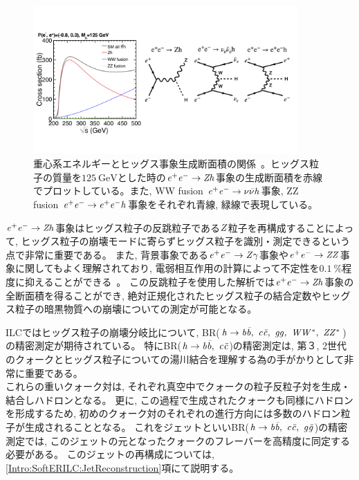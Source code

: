 \begin{figure}[htbp]
 \centering
 \includegraphics[trim= 0 50 0 50, width=0.9\textwidth, clip]{Figure/1Introduction/4eetoZH.png}
 \caption[重心系エネルギーとヒッグス事象生成断面積の関係]{重心系エネルギーとヒッグス事象生成断面積の関係~\cite{ILCTDRVP}。ヒッグス粒子の質量を$125\ \mathrm{GeV}$とした時の$\it e^+e^- \to Zh$事象の生成断面積を赤線でプロットしている。また, WW fusion $\it e^+e^- \to \nu \bar{\nu} h$事象, ZZ fusion $\it e^+e^- \to e^+ e^- h$事象をそれぞれ青線, 緑線で表現している。}
 \label{4eetoZH}
\end{figure}

$\it e^+e^- \to Zh$事象はヒッグス粒子の反跳粒子である$\it Z$粒子を再構成することによって, ヒッグス粒子の崩壊モードに寄らずヒッグス粒子を識別・測定できるという点で非常に重要である。
また, 背景事象である$\it e^+e^- \to Z\gamma$事象や$\it e^+e^- \to ZZ$事象に関してもよく理解されており, 電弱相互作用の計算によって不定性を$0.1\ \%$程度に抑えることができる~\cite{GlobalProject}。
この反跳粒子を使用した解析では$\it e^+e^- \to Zh$事象の全断面積を得ることができ, 絶対正規化されたヒッグス粒子の結合定数やヒッグス粒子の暗黒物質への崩壊についての測定が可能となる。

ILCではヒッグス粒子の崩壊分岐比について, BR($\it h \to b \bar{b},\ c \bar{c},\ gg,\ WW^*,\ ZZ^*$)の精密測定が期待されている。
特にBR($\it h \to b \bar{b},\ c \bar{c}$)の精密測定は, 第３, 2世代のクォークとヒッグス粒子についての湯川結合を理解する為の手がかりとして非常に重要である。\\

\newpage
これらの重いクォーク対は, それぞれ真空中でクォークの粒子反粒子対を生成・結合しハドロンとなる。
更に, この過程で生成されたクォークも同様にハドロンを形成するため, 初めのクォーク対のそれぞれの進行方向には多数のハドロン粒子が生成されることとなる。
これをジェットといいBR($\it h \to b \bar{b},\ c \bar{c},\ g \bar{g}$)の精密測定では, このジェットの元となったクォークのフレーバーを高精度に同定する必要がある。
このジェットの再構成については, \ref{Intro:SoftERILC:JetReconstruction}項にて説明する。


